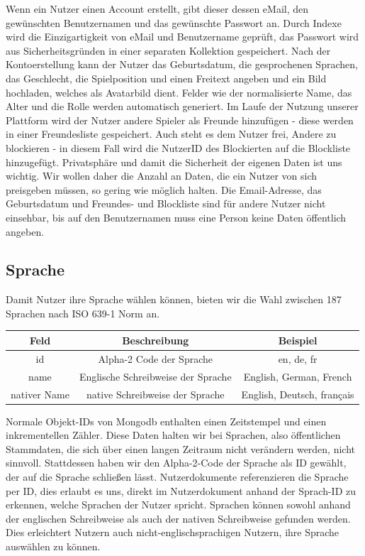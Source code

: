 Wenn ein Nutzer einen Account erstellt, gibt dieser dessen eMail, den gewünschten Benutzernamen und das gewünschte Passwort an. Durch Indexe wird die Einzigartigkeit von eMail und Benutzername geprüft, das Passwort wird aus Sicherheitsgründen in einer separaten Kollektion gespeichert. Nach der Kontoerstellung kann der Nutzer das Geburtsdatum, die gesprochenen Sprachen, das Geschlecht, die Spielposition und einen Freitext angeben und ein Bild hochladen, welches als Avatarbild dient. Felder wie der normalisierte Name, das Alter und die Rolle werden automatisch generiert. Im Laufe der Nutzung unserer Plattform wird der Nutzer andere Spieler als Freunde hinzufügen - diese werden in einer Freundesliste gespeichert. Auch steht es dem Nutzer frei, Andere zu blockieren - in diesem Fall wird die NutzerID des Blockierten auf die Blockliste hinzugefügt.
Privatsphäre und damit die Sicherheit der eigenen Daten ist uns wichtig. Wir wollen daher die Anzahl an Daten, die ein Nutzer von sich preisgeben müssen, so gering wie möglich halten. Die Email-Adresse, das Geburtsdatum und Freundes- und Blockliste sind für andere Nutzer nicht einsehbar, bis auf den Benutzernamen muss eine Person keine Daten öffentlich angeben.

\subsection{Sprache}
Damit Nutzer ihre Sprache wählen können, bieten wir die Wahl zwischen 187 Sprachen nach ISO 639-1 Norm an.\cite{ISO639-1} 

\begin{center}
    \begin{tabular}{ |c|c|c| }
        \hline
        Feld & Beschreibung & Beispiel \\
        \hline
        id & Alpha-2 Code der Sprache & en, de, fr \\
        name & Englische Schreibweise der Sprache & English, German, French \\
        nativer Name & native Schreibweise der Sprache & English, Deutsch, français \\
        \hline
    \end{tabular}
\end{center}
Normale Objekt-IDs von Mongodb enthalten einen Zeitstempel und einen inkrementellen Zähler.\cite{MG15} Diese Daten halten wir bei Sprachen, also öffentlichen Stammdaten, die sich über einen langen Zeitraum nicht verändern werden, nicht sinnvoll. Stattdessen haben wir den Alpha-2-Code der Sprache als ID gewählt, der auf die Sprache schließen lässt. Nutzerdokumente referenzieren die Sprache per ID, dies erlaubt es uns, direkt im Nutzerdokument anhand der Sprach-ID zu erkennen, welche Sprachen der Nutzer spricht.
Sprachen können sowohl anhand der englischen Schreibweise als auch der nativen Schreibweise gefunden werden. Dies erleichtert Nutzern auch nicht-englischsprachigen Nutzern, ihre Sprache auswählen zu können.

